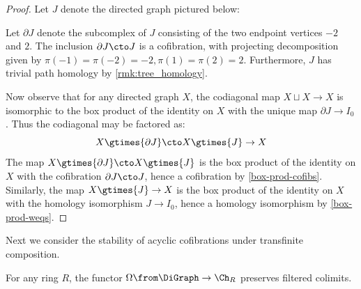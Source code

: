 \begin{proof}
Let $J$ denote the directed graph pictured below:

\begin{figure}[H]
    \centering
\end{figure}

Let $\partial J$ denote the subcomplex of $J$ consisting of the two endpoint vertices $-2$ and $2$. The inclusion $\partial J \cto J$ is a cofibration, with projecting decomposition given by $\pi(-1) = \pi(-2) = -2, \pi(1) = \pi(2) = 2$.  Furthermore, $J$ has trivial path homology by \cref{rmk:tree_homology}.

Now observe that for any directed graph $X$, the codiagonal map $X \sqcup X \to X$ is isomorphic to the box product of the identity on $X$ with the unique map $\partial J \to I_0$. Thus the codiagonal may be factored as:
\[
X \gtimes{\partial J} \cto X \gtimes{J} \to X
\]
The map $X \gtimes{\partial J} \cto X \gtimes{J}$ is the box product of the identity on $X$ with the cofibration $\partial J \cto J$, hence a cofibration by \cref{box-prod-cofibs}. Similarly, the map $X \gtimes{J} \to X$ is the box product of the identity on $X$ with the homology isomorphism $J \to I_0$, hence a homology isomorphism by \cref{box-prod-weqs}.
\end{proof}

Next we consider the stability of acyclic cofibrations under transfinite composition.

\begin{proposition}\label{Omega-filtered-colim}
For any ring $R$, the functor $\Omega \from \DiGraph \to \Ch_R$ preserves filtered colimits.
\end{proposition}

